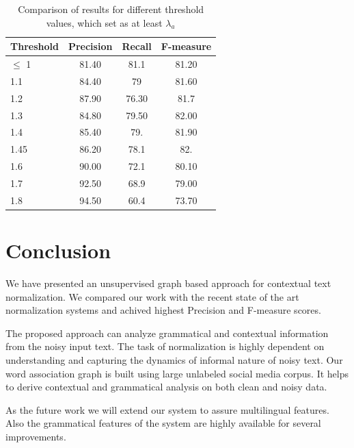 \documentclass[preprint,review,12pt]{elsarticle}
\begin{document}
\begin{table}[thb]
  \centering
  \begin{tabular}[th]{lccc}
    \hline
    Threshold & Precision & Recall & F-measure \\
    \hline
    $\leq$ 1 & 81.40 & 81.1 & 81.20 \\
    1.1 & 84.40 & 79 & 81.60 \\
    1.2 & 87.90 & 76.30 & 81.7 \\
    1.3 & 84.80 & 79.50 & 82.00 \\
    1.4 & 85.40 & 79. & 81.90 \\
    1.45 & 86.20 & 78.1 & 82. \\
    1.6 & 90.00 & 72.1 & 80.10 \\
    1.7 & 92.50 & 68.9 & 79.00 \\
    1.8 & 94.50 & 60.4 & 73.70 \\
    \hline
  \end{tabular}
  \caption{Comparison of results for different threshold values, which set as at least $\lambda_a$}
\label{tab:thresholds}
\end{table}

\section{Conclusion}

We have presented an unsupervised graph based approach for contextual text normalization. We compared our work with the recent state of the art normalization systems and achived highest Precision and F-measure scores.

The proposed approach can analyze grammatical and contextual information from the noisy input text. The task of normalization is highly dependent on understanding and capturing the dynamics of informal nature of noisy text. Our word association graph is built using large unlabeled social media corpus. It helps to derive contextual and grammatical analysis on both clean and noisy data.

As the future work we will extend our system to assure multilingual features. Also the grammatical features of the system are highly available for several improvements.






\end{document}
